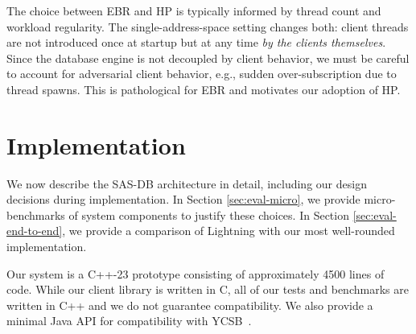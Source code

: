 The choice between EBR and HP is typically informed by thread count and workload
regularity. The single-address-space setting changes both: client threads are
not introduced once at startup but at any time \emph{by the clients themselves}.
Since the database engine is not decoupled by client behavior, we must be
careful to account for adversarial client behavior, e.g., sudden
over-subscription due to thread spawns. This is pathological for EBR and
motivates our adoption of HP.

\section{Implementation}

We now describe the SAS-DB architecture in detail, including our design
decisions during implementation. In Section \ref{sec:eval-micro}, we provide
micro-benchmarks of system components to justify these choices. In Section
\ref{sec:eval-end-to-end}, we provide a comparison of Lightning with our most
well-rounded implementation.

Our system is a C++-23 prototype consisting of approximately 4500 lines of code.
While our client library is written in C, all of our tests and benchmarks are
written in C++ and we do not guarantee compatibility. We also provide a minimal
Java API for compatibility with YCSB~\cite{cooper10ycsb}.

